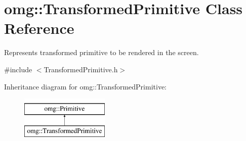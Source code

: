 \hypertarget{classomg_1_1_transformed_primitive}{}\section{omg\+::Transformed\+Primitive Class Reference}
\label{classomg_1_1_transformed_primitive}


Represents transformed primitive to be rendered in the screen.  




{\ttfamily \#include $<$Transformed\+Primitive.\+h$>$}

Inheritance diagram for omg\+::Transformed\+Primitive\+:\begin{figure}[H]
\begin{center}
\leavevmode
\includegraphics[height=2.000000cm]{classomg_1_1_transformed_primitive}
\end{center}
\end{figure}
